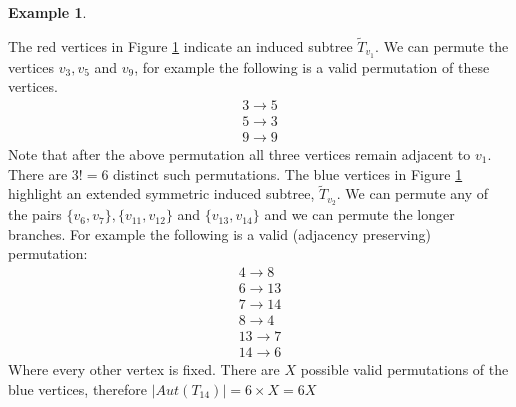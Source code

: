 \documentclass[12pt]{article} %
\theoremstyle{definition}
\newtheorem{ex}[thm]{Example}
\begin{document}
\begin{ex}
\begin{figure}[H]
\caption{}\label{fig2}
\end{figure}
The red vertices in Figure \ref{fig2} indicate an induced subtree $\tilde{T}_{v_{1}}$.  We can permute the 
vertices $v_{3},v_{5}$ and $v_{9}$, for example the following is a valid permutation of these 
vertices.
\begin{align*}
 3 \rightarrow 5\\
 5 \rightarrow 3\\
 9 \rightarrow 9 
\end{align*}
Note that after the above permutation all three vertices remain adjacent to $v_{1}$.  There are $3! = 6$
 distinct such permutations. The blue vertices in Figure \ref{fig2} highlight an extended 
symmetric induced subtree, 
$\tilde{T}_{v_{2}}$.  We can permute any of the pairs $\{v_{6},v_{7}\}, \{v_{11},v_{12}\}$ 
and $\{v_{13},v_{14}\}$ and we can permute the longer branches.  For example the following 
is a valid (adjacency preserving) permutation:
\begin{align*}
 4\rightarrow 8 \\
6 \rightarrow 13\\
7 \longrightarrow 14\\
8 \rightarrow 4\\
13 \rightarrow 7\\
14 \rightarrow 6
\end{align*}
Where every other vertex is fixed.  There are $X$ possible valid permutations of the blue 
vertices, therefore $|Aut(T_{14})| = 6 \times X = 6X$
\end{ex}

\end{document}
